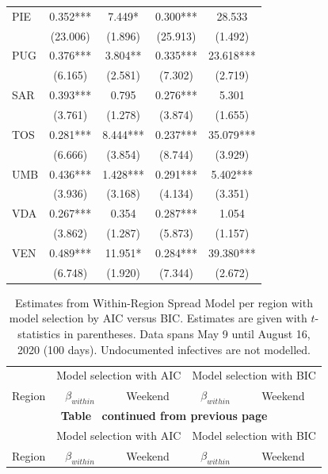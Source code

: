\documentclass[12pt]{article}
\begin{document}
\begin{appendices}
\begin{longtable}{@{}lcccc@{}}
            PIE & 0.352*** & 7.449* & 0.300*** & 28.533 \\ 
             & (23.006) & (1.896) & (25.913) & (1.492) \\ 
            PUG & 0.376*** & 3.804** & 0.335*** & 23.618*** \\ 
             & (6.165) & (2.581) & (7.302) & (2.719) \\ 
            SAR & 0.393*** & 0.795 & 0.276*** & 5.301 \\ 
             & (3.761) & (1.278) & (3.874) & (1.655) \\ 
            TOS & 0.281*** & 8.444*** & 0.237*** & 35.079*** \\ 
             & (6.666) & (3.854) & (8.744) & (3.929) \\ 
            UMB & 0.436*** & 1.428*** & 0.291*** & 5.402*** \\ 
             & (3.936) & (3.168) & (4.134) & (3.351) \\ 
            VDA & 0.267*** & 0.354 & 0.287*** & 1.054 \\ 
             & (3.862) & (1.287) & (5.873) & (1.157) \\ 
            VEN & 0.489*** & 11.951* & 0.284*** & 39.380*** \\ 
             & (6.748) & (1.920) & (7.344) & (2.672) \\* \bottomrule
    	\end{longtable}
		
		\begin{longtable}{@{}lcccc@{}}
    		\caption{Estimates from Within-Region Spread Model per region with model selection by AIC versus BIC. Estimates are given with $t$-statistics in parentheses. Data spans May 9 until August 16, 2020 (100 days). Undocumented infectives are not modelled.}
    		\label{tab:model_within_aic_vs_bic}\\
    		\toprule
    		                & \multicolumn{2}{c}{Model selection with AIC} & \multicolumn{2}{c}{Model selection with BIC} \\
    		                \cmidrule(lr){2-3}
                            \cmidrule(lr){4-5}
    		Region          & $\beta_{within}$ & Weekend & $\beta_{within}$ & Weekend \\* \midrule
    		\endfirsthead
    		
    		\multicolumn{5}{c}{{\bfseries Table \thetable\ continued from previous page}} \\
    		\toprule
    		                & \multicolumn{2}{c}{Model selection with AIC} & \multicolumn{2}{c}{Model selection with BIC} \\
    		                \cmidrule(lr){2-3}
                            \cmidrule(lr){4-5}
    		Region          & $\beta_{within}$ & Weekend & $\beta_{within}$ & Weekend \\* \midrule
    		\endhead
    		

\end{longtable}
\end{appendices}
\end{document}
